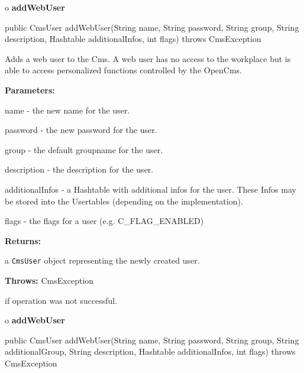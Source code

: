 o {\bf addWebUser} 

\begin{PRE}
 public CmsUser addWebUser(String name,
                           String password,
                           String group,
                           String description,
                           Hashtable additionalInfos,
                           int flags) throws CmsException
\end{PRE}

\begin{description}
\htmlDD Adds a web user to the Cms. \htmlBR
A web user has no access to the workplace but is able to access personalized
functions controlled by the OpenCms. 

\begin{description}
\item {\bf Parameters:}  

name - the new name for the user.  

password - the new password for the user.  

group - the default groupname for the user.  

description - the description for the user.  

additionalInfos - a Hashtable with additional infos for the user. These Infos
may be stored into the Usertables (depending on the implementation).  

flags - the flags for a user (e.g. C\_FLAG\_ENABLED)  
\item {\bf Returns:}  

a {\tt CmsUser} object representing the newly created user.  
\item {\bf Throws:} CmsException  

if operation was not successful.  
\end{description}

\end{description}

o {\bf addWebUser} 

\begin{PRE}
 public CmsUser addWebUser(String name,
                           String password,
                           String group,
                           String additionalGroup,
                           String description,
                           Hashtable additionalInfos,
                           int flags) throws CmsException
\end{PRE}

